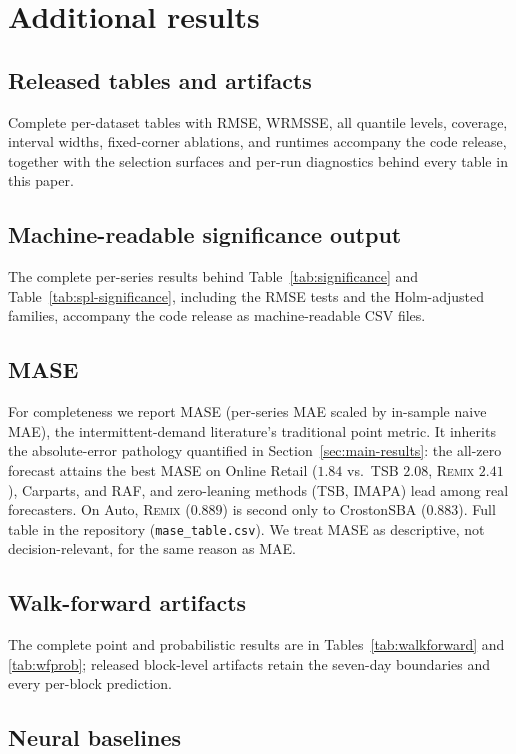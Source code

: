 \documentclass[twocolumn,10pt]{article}
\theoremstyle{definition}
\newcommand{\REMIX}{\textsc{Remix}}
\begin{document}
\section{Additional results}\label{app:extra}



\subsection{Released tables and artifacts}
Complete per-dataset tables with RMSE, WRMSSE, all quantile levels,
coverage, interval widths, fixed-corner ablations, and runtimes accompany
the code release, together with the selection surfaces and per-run
diagnostics behind every table in this paper.

\subsection{Machine-readable significance output}
The complete per-series results behind Table~\ref{tab:significance} and
Table~\ref{tab:spl-significance}, including the RMSE tests and the
Holm-adjusted families, accompany the code release as machine-readable
CSV files.

\subsection{MASE}
For completeness we report MASE (per-series MAE scaled by in-sample
naive MAE), the intermittent-demand literature's traditional point
metric. It inherits the absolute-error pathology quantified in
Section~\ref{sec:main-results}: the all-zero forecast attains the best
MASE on Online Retail ($1.84$ vs.\ TSB $2.08$, \REMIX{} $2.41$),
Carparts, and RAF, and zero-leaning methods (TSB, IMAPA) lead among real
forecasters. On Auto, \REMIX{} ($0.889$) is second only to CrostonSBA
($0.883$). Full table in the repository
(\texttt{mase\_table.csv}). We treat MASE as descriptive, not
decision-relevant, for the same reason as MAE.

\subsection{Walk-forward artifacts}
The complete point and probabilistic results are in
Tables~\ref{tab:walkforward} and \ref{tab:wfprob}; released block-level
artifacts retain the seven-day boundaries and every per-block prediction.

\subsection{Neural baselines}
\label{app:neural}
\end{document}
